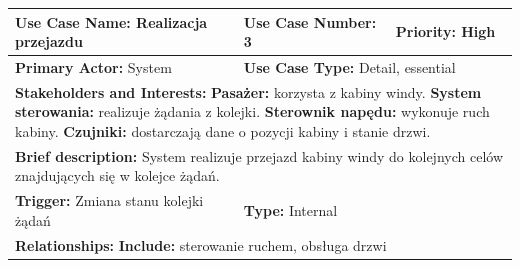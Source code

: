 \documentclass[12pt,a4paper]{article}
\begin{document}
\begin{table}[h!]
\centering
\begin{tabular}{|p{}|p{}|p{}|}
\hline
\textbf{Use Case Name:} Realizacja przejazdu & \textbf{Use Case Number:} 3 & \textbf{Priority:} High \\ \hline
\textbf{Primary Actor:} System & \multicolumn{2}{l|}{\textbf{Use Case Type:} Detail, essential} \\ \hline

\multicolumn{3}{|p{0.9\textwidth}|}{\textbf{Stakeholders and Interests:} \newline
\textbf{Pasażer:} korzysta z kabiny windy. \newline
\textbf{System sterowania:} realizuje żądania z kolejki. \newline
\textbf{Sterownik napędu:} wykonuje ruch kabiny. \newline
\textbf{Czujniki:} dostarczają dane o pozycji kabiny i stanie drzwi.} \\ \hline

\multicolumn{3}{|p{0.9\textwidth}|}{\textbf{Brief description:} System realizuje przejazd kabiny windy do kolejnych celów znajdujących się w kolejce żądań.} \\ \hline

\textbf{Trigger:} Zmiana stanu kolejki żądań & \multicolumn{2}{l|}{\textbf{Type:} Internal} \\ \hline

\multicolumn{3}{|p{0.9\textwidth}|}{\textbf{Relationships:} \newline
\textbf{Include:} sterowanie ruchem, obsługa drzwi} \\ \hline


\end{tabular}
\end{table}
\end{document}

